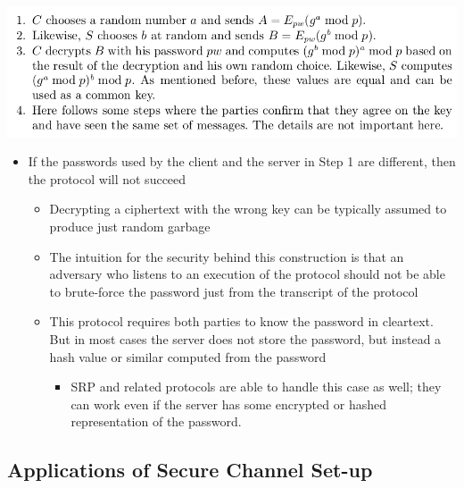 \documentclass[11pt]{article}
\begin{document}
\begin{center}
\includegraphics[width=.9\linewidth]{Network Security Mechanisms (12)/screenshot_2018-11-11_20-08-08.png}
\end{center}

\begin{itemize}
\item If the passwords used by the client and the server in Step 1 are different, then the protocol will not succeed
\begin{itemize}
\item Decrypting a ciphertext with the wrong key can be typically assumed to produce just random garbage
\item The intuition for the security behind this construction is that an adversary who listens to an execution of the protocol should not be able to brute-force the password just from the transcript of the protocol
\item This protocol requires both parties to know the password in cleartext. But in most cases the server does not store the password, but instead a hash value or similar computed from the password
\begin{itemize}
\item SRP and related protocols are able to handle this case as well; they can work even if the server has some encrypted or hashed representation of the password.
\end{itemize}
\end{itemize}
\end{itemize}

\subsection{Applications of Secure Channel Set-up}
\label{sec:org52805c4}
\end{document}
